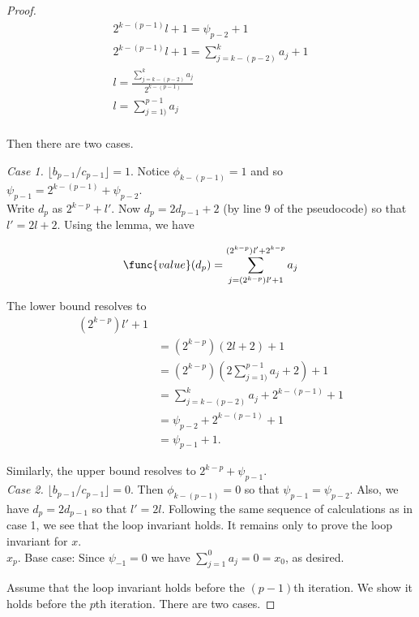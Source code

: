 \documentclass[11pt, answers]{exam}
\theoremstyle{plain}
\theoremstyle{definition}
\begin{document}
\begin{questions}
\begin{parts}
\begin{solution}
\begin{proof}
\begin{align*}
2^{k-(p-1)}\mathit{l} + 1 = \psi_{p-2} + 1 \\
2^{k-(p-1)}\mathit{l} + 1 = \sum_{j=k-(p-2)}^{k}a_j + 1 \\
\mathit{l}= \frac{\sum_{j=k-(p-2)}^{k}a_j}{2^{k-(p-1)}} \\
\mathit{l}= \sum_{j=1)}^{p-1}a_j \\
\end{align*}

Then there are two cases.

\textit{Case 1.} $\lfloor b_{p-1}/c_{p-1} \rfloor = 1$. Notice $\phi_{k - (p-1)} = 1$ and so $\psi_{p-1} = 2^{k-(p-1)} + \psi_{p-2}.$\\

Write $d_p$ as $2^{k-p} + \mathit{l}'$. Now $d_p = 2d_{p-1} + 2$ (by line 9 of the pseudocode) so that $\mathit{l'} = 2\mathit{l} + 2$. Using the lemma, we have

\begin{align*}
\func{value}(d_p) = \sum_{j = (2^{k-p})\mathit{l'} + 1}^{(2^{k-p})\mathit{l'} + 2^{k-p}}a_j \\
\end{align*}

The lower bound resolves to 
\begin{align*}
(2^{k-p})\mathit{l'} + 1 \\
&= (2^{k-p})(2\mathit{l} + 2) + 1 \\
&= (2^{k-p})(2 \sum_{j=1)}^{p-1}a_j + 2) + 1 \\
&= \sum_{j=k-(p-2)}^{k}a_j + 2^{k-(p-1)} + 1 \\
&= \psi_{p-2} + 2^{k-(p-1)} + 1 \\
&= \psi_{p-1} + 1.
\end{align*}

Similarly, the upper bound resolves to $2^{k-p} + \psi_{p-1}$.\\

\textit{Case 2.} $\lfloor b_{p-1}/c_{p-1} \rfloor = 0$. Then $\phi_{k - (p-1)} = 0$ so that $\psi_{p-1} = \psi_{p-2}.$ Also, we have $d_p = 2d_{p-1}$ so that $\mathit{l'} = 2\mathit{l}$. Following the same sequence of calculations as in case 1, we see that the loop invariant holds. It remains only to prove the loop invariant for $x$.\\

$x_p$. Base case: Since $\psi_{-1} = 0$ we have $\sum_{j=1}^{0}a_j = 0 = x_0$, as desired.

Assume that the loop invariant holds before the $(p-1)$th iteration. We show it holds before the $p$th iteration. There are two cases.


\end{proof}
\end{solution}
\end{parts}
\end{questions}
\end{document}
